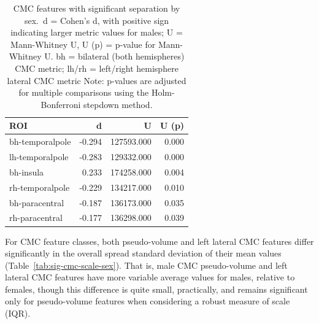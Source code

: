 \documentclass{article}
\begin{document}
\begin{table}
\centering
\begin{tabular}{lrrr}
	\toprule
	ROI & d & U & U (p) \\
	\midrule
	bh-temporalpole & -0.294 & 127593.000 & 0.000 \\
	lh-temporalpole & -0.283 & 129332.000 & 0.000 \\
	bh-insula       &  0.233 & 174258.000 & 0.004 \\
	rh-temporalpole & -0.229 & 134217.000 & 0.010 \\
	bh-paracentral  & -0.187 & 136173.000 & 0.035 \\
	rh-paracentral  & -0.177 & 136298.000 & 0.039 \\
	\bottomrule
\end{tabular}
\footnotesize
\caption{CMC features with significant separation by sex.\
d = Cohen's d, with positive sign indicating larger metric values for males;
U = Mann-Whitney U, U (p) = p-value for Mann-Whitney U.
bh = bilateral (both hemispheres) CMC metric;
lh/rh = left/right hemisphere lateral CMC metric
Note: p-values are adjusted for multiple comparisons using the
Holm-Bonferroni stepdown method.} \label{tab:sig-cmc-sex}
\normalsize
\end{table}

For CMC feature classes, both pseudo-volume and left lateral CMC features
differ significantly in the overall spread standard deviation of their mean
values (Table~\ref{tab:sig-cmc-scale-sex}). That is, male CMC pseudo-volume
and left lateral CMC features have more variable average values for males,
relative to females, though this difference is quite small, practically, and
remains significant only for pseudo-volume features when considering a robust
measure of scale (IQR).
\end{document}
